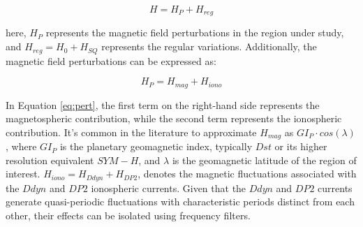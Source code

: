 \documentclass[12pt]{article}
\begin{document}
\begin{equation}
	\label{eq:diono1}
	H = H_P+H_{reg}
\end{equation}

\noindent here, $H_{P}$ represents the magnetic field perturbations in the region under study, and $H_{reg} =H_0+H_{SQ}$ represents the regular variations. Additionally, the magnetic field perturbations can be expressed as:

\begin{equation}
	\label{eq:pert}
	H_P = H_{mag}+H_{iono}
\end{equation}

In Equation \ref{eq:pert}, the first term on the right-hand side represents the magnetospheric contribution, while the second term represents the ionospheric contribution. It's common in the literature to approximate $H_{mag}$  as $GI_P \cdot cos(\lambda)$, where $GI_P$ is the planetary geomagnetic index, typically $Dst$ or its higher resolution equivalent $SYM-H$, and $\lambda$  is the geomagnetic latitude of the region of interest. $H_{iono} = H_{Ddyn}+H_{DP2}$, denotes the magnetic fluctuations associated with the $Ddyn$ and $DP2$ ionospheric currents. Given that the $Ddyn$ and $DP2$ currents generate quasi-periodic fluctuations with characteristic periods distinct from each other, their effects can be isolated using frequency filters.\\
\end{document}
